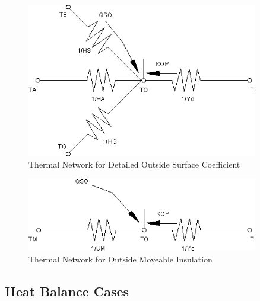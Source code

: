 \begin{figure}[hbtp] %
\centering
\includegraphics[width=0.9\textwidth, height=0.9\textheight, keepaspectratio=true]{media/image421.png}
\caption{Thermal Network for Detailed Outside Surface Coefficient \protect \label{fig:thermal-network-for-detailed-outside-surface}}
\end{figure}

\begin{figure}[hbtp] %
\centering
\includegraphics[width=0.9\textwidth, height=0.9\textheight, keepaspectratio=true]{media/image422.png}
\caption{Thermal Network for Outside Moveable Insulation \protect \label{fig:thermal-network-for-outside-moveable}}
\end{figure}

\subsection{Heat Balance Cases}\label{heat-balance-cases}

